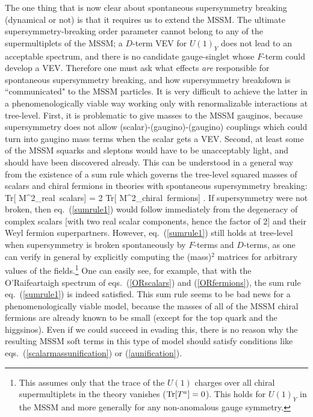 The one thing that is now clear about spontaneous supersymmetry
breaking (dynamical or not) is that it requires us to extend the MSSM.
The ultimate supersymmetry-breaking order parameter cannot belong to any
of the supermultiplets of the MSSM; a $D$-term VEV for $U(1)_Y$ does not
lead to an acceptable spectrum, and there is no candidate gauge-singlet
whose $F$-term could develop a VEV.
Therefore one must ask what effects {\it are} responsible for
spontaneous supersymmetry breaking, and how
supersymmetry breakdown is ``communicated" to the MSSM particles.
It is very difficult to achieve the latter in a phenomenologically viable
way working only
with renormalizable interactions at tree-level.
First, it is problematic
to give masses to the MSSM gauginos, because supersymmetry does not allow
(scalar)-(gaugino)-(gaugino) couplings which could turn into gaugino
mass terms when the scalar gets a VEV.
Second, at least some of the MSSM
squarks and sleptons would have to be unacceptably light, and should have
been discovered already. This can be understood in a general way from
the
existence of a sum rule which governs the tree-level squared
masses of scalars and chiral fermions in theories with spontaneous
supersymmetry breaking:
\beq
{\rm Tr}[ M^2_{\rm real~scalars}] = 2 {\rm Tr}[ M^2_{\rm chiral~fermions}]
{}.
\label{sumrule1}
\eeq
If supersymmetry were not broken, then eq.~(\ref{sumrule1})
would follow immediately from the degeneracy of complex
scalars [with two real scalar components, hence the factor of 2] 
and their Weyl fermion superpartners.
 However, eq.~(\ref{sumrule1}) still
holds at tree-level when supersymmetry is broken spontaneously by
$F$-terms
and $D$-terms, as one can verify in general by explicitly computing
the (mass)$^2$ matrices for arbitrary values of the
fields.\footnote{This assumes only that the trace of the $U(1)$ charges 
over all chiral supermultiplets in
the theory vanishes (${\rm Tr}[ T^a] = 0$). This holds for
$U(1)_Y$
in the MSSM and more generally for any non-anomalous gauge symmetry.}
One can easily see, for example, that with the O'Rai\-f\-ear\-taigh
spectrum of eqs.~(\ref{ORscalars}) and (\ref{ORfermions}),
the sum rule eq.~(\ref{sumrule1}) is indeed satisfied.
This sum rule seems to be bad news for a
phenomenologically viable model, because the masses of all of the
MSSM chiral fermions are already known to be small (except for the top
quark and the higgsinos).
Even if we could succeed in evading this, there is no reason why the
resulting MSSM soft
terms in this type of model should satisfy conditions like
eqs.~(\ref{scalarmassunification}) or (\ref{aunification}).

